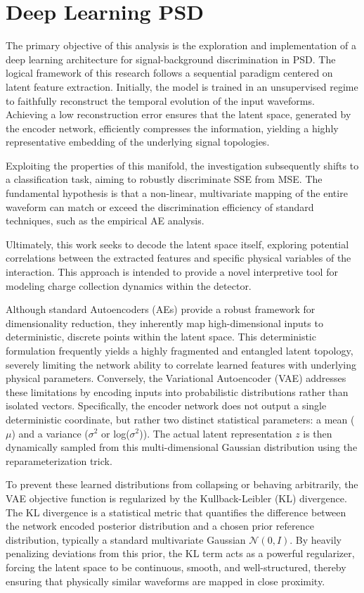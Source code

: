 \chapter{Deep Learning \ac{PSD}}
\label{chapter:DL_PSD}
The primary objective of this analysis is the exploration and implementation of a deep learning architecture for signal-background discrimination in \ac{PSD}. The logical framework of this research follows a sequential paradigm centered on latent feature extraction. Initially, the model is trained in an unsupervised regime to faithfully reconstruct the temporal evolution of the input waveforms. Achieving a low reconstruction error ensures that the latent space, generated by the encoder network, efficiently compresses the information, yielding a highly representative embedding of the underlying signal topologies. 

Exploiting the properties of this manifold, the investigation subsequently shifts to a classification task, aiming to robustly discriminate \ac{SSE} from \ac{MSE}. The fundamental hypothesis is that a non-linear, multivariate mapping of the entire waveform can match or exceed the discrimination efficiency of standard techniques, such as the empirical \ac{AE} analysis. 

Ultimately, this work seeks to decode the latent space itself, exploring potential correlations between the extracted features and specific physical variables of the interaction. This approach is intended to provide a novel interpretive tool for modeling charge collection dynamics within the detector.

Although standard Autoencoders (AEs) provide a robust framework for dimensionality reduction, they inherently map high-dimensional inputs to deterministic, discrete points within the latent space. This deterministic formulation frequently yields a highly fragmented and entangled latent topology, severely limiting the network ability to correlate learned features with underlying physical parameters. Conversely, the Variational Autoencoder (VAE) addresses these limitations by encoding inputs into probabilistic distributions rather than isolated vectors. Specifically, the encoder network does not output a single deterministic coordinate, but rather two distinct statistical parameters: a mean ($\mu$) and a variance ($\sigma^2$ or log($\sigma^2$)). The actual latent representation $z$ is then dynamically sampled from this multi-dimensional Gaussian distribution using the reparameterization trick. 

To prevent these learned distributions from collapsing or behaving arbitrarily, the VAE objective function is regularized by the Kullback-Leibler (KL) divergence. The KL divergence is a statistical metric that quantifies the difference between the network encoded posterior distribution and a chosen prior reference distribution, typically a standard multivariate Gaussian $\mathcal{N}(0, I)$. By heavily penalizing deviations from this prior, the KL term acts as a powerful regularizer, forcing the latent space to be continuous, smooth, and well-structured, thereby ensuring that physically similar waveforms are mapped in close proximity.

